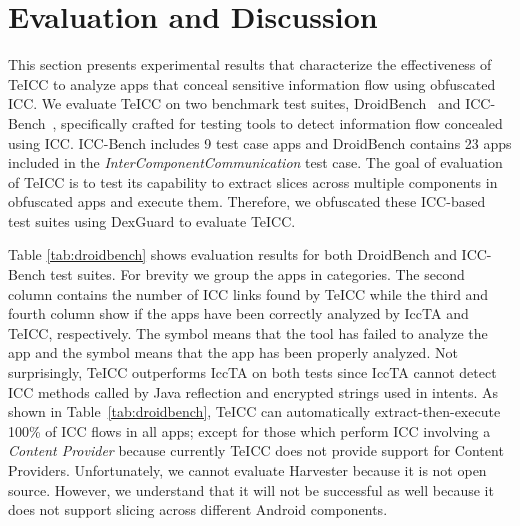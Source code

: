 \section{Evaluation and Discussion}
\label{sec:discussion}
This section presents experimental results that characterize the effectiveness of TeICC to analyze apps that conceal sensitive information flow using obfuscated ICC.
We evaluate TeICC on two benchmark test suites, DroidBench~\cite{droidbenchpage} and ICC-Bench~\cite{wei2014amandroid}, specifically crafted for testing tools to detect information flow concealed using ICC. ICC-Bench includes 9 test case apps
and DroidBench contains 23 apps included in the \emph{InterComponentCommunication} test case. The goal of evaluation of TeICC is to test its capability to extract slices across multiple components in obfuscated apps and execute them. Therefore, we obfuscated these ICC-based test suites using DexGuard\cite{dexguardpage} to evaluate TeICC.





Table \ref{tab:droidbench} shows evaluation results for both DroidBench and ICC-Bench test suites. For brevity we group the apps in categories. The second column contains the number of ICC links found by TeICC while the third and fourth column show if the apps have been correctly analyzed by IccTA\cite{li2015iccta} and TeICC, respectively. The symbol  means that the tool has failed to analyze the app and the symbol  means that the app has been properly analyzed. Not surprisingly, TeICC outperforms IccTA on both tests since IccTA cannot detect ICC methods called by Java reflection and encrypted strings used in intents. As shown in Table~\ref{tab:droidbench}, TeICC can automatically extract-then-execute 100\% of ICC flows in all apps; except for those which perform ICC involving a \emph{Content Provider} because currently TeICC does not provide support for Content Providers. Unfortunately, we cannot evaluate Harvester\cite{rasthofer2016harvesting} because it is not open source. However, we understand that it will not be successful as well because it does not support slicing across different Android components.


